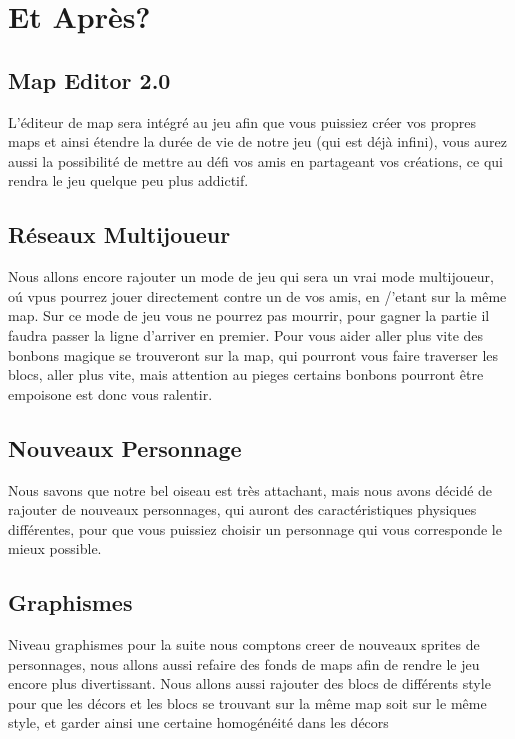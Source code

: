 \documentclass [11pt]{report}
\begin{document}
	
\chapter{Et Après?}
	\section{Map Editor 2.0}
	L'éditeur de map sera intégré au jeu afin que vous puissiez créer vos propres maps et ainsi étendre la durée de vie de notre jeu (qui est déjà infini), vous aurez aussi la possibilité de mettre au défi vos amis en partageant vos créations, ce qui rendra le jeu quelque peu plus addictif.
	
	
		
		\vspace{10mm}
	
	
	
	\section{Réseaux Multijoueur}
	Nous allons encore rajouter un mode de jeu qui sera un vrai mode multijoueur, o\'u vpus pourrez jouer directement contre un de vos amis, en /'etant sur la m\^eme map. Sur ce mode de jeu vous ne pourrez pas mourrir, pour gagner la partie il faudra passer la ligne d'arriver en premier. Pour vous aider aller plus vite des bonbons magique se trouveront sur la map, qui pourront vous faire traverser les blocs, aller plus vite, mais attention au pieges certains bonbons pourront \^etre empoisone est donc vous ralentir.

	
	\vspace{10mm}



	\section{Nouveaux Personnage}
	Nous savons que notre bel oiseau est très attachant, mais nous avons décidé de rajouter de nouveaux personnages, qui auront des caractéristiques physiques différentes, pour que vous puissiez choisir un personnage qui vous corresponde le mieux possible.
	
	
		
		\vspace{10mm}
	
	
	
	\section{Graphismes}
	Niveau graphismes pour la suite nous comptons creer de nouveaux sprites de personnages, nous allons aussi refaire des fonds de maps afin de rendre le jeu encore plus divertissant. Nous allons aussi rajouter des blocs de différents style pour que les décors et les blocs se trouvant sur la même map soit sur le même style, et garder ainsi une certaine homogénéité dans les décors
\newpage
\end{document}
